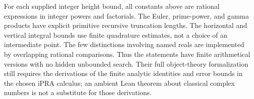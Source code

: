 For each supplied integer height bound, all constants above are
rational expressions in integer powers and factorials.  The Euler,
prime-power, and gamma products have explicit primitive recursive
truncation lengths.  The horizontal and vertical integral bounds use
finite quadrature estimates, not a choice of an intermediate point.
The few distinctions involving named reals are implemented by
overlapping rational comparisons.  Thus the statements have finite
arithmetical versions with no hidden unbounded search.  Their full
object-theory formalization still requires the derivations of the
finite analytic identities and error bounds in the chosen iPRA
calculus; an ambient Lean theorem about classical complex numbers is
not a substitute for those derivations.
